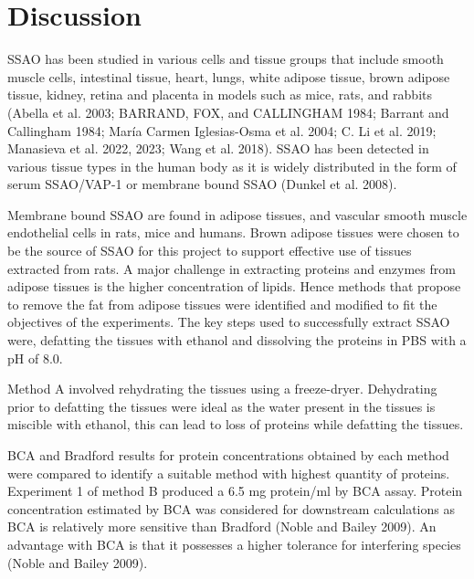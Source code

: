 \documentclass[
  letterpaper,
  DIV=11,
  numbers=noendperiod]{scrreprt}
\begin{document}

\chapter{Discussion}\label{discussion}

SSAO has been studied in various cells and tissue groups that include
smooth muscle cells, intestinal tissue, heart, lungs, white adipose
tissue, brown adipose tissue, kidney, retina and placenta in models such
as mice, rats, and rabbits (Abella et al. 2003; BARRAND, FOX, and
CALLINGHAM 1984; Barrant and Callingham 1984; María Carmen Iglesias-Osma
et al. 2004; C. Li et al. 2019; Manasieva et al. 2022, 2023; Wang et al.
2018). SSAO has been detected in various tissue types in the human body
as it is widely distributed in the form of serum SSAO/VAP-1 or membrane
bound SSAO (Dunkel et al. 2008).

Membrane bound SSAO are found in adipose tissues, and vascular smooth
muscle endothelial cells in rats, mice and humans. Brown adipose tissues
were chosen to be the source of SSAO for this project to support
effective use of tissues extracted from rats. A major challenge in
extracting proteins and enzymes from adipose tissues is the higher
concentration of lipids. Hence methods that propose to remove the fat
from adipose tissues were identified and modified to fit the objectives
of the experiments. The key steps used to successfully extract SSAO
were, defatting the tissues with ethanol and dissolving the proteins in
PBS with a pH of 8.0.

Method A involved rehydrating the tissues using a freeze-dryer.
Dehydrating prior to defatting the tissues were ideal as the water
present in the tissues is miscible with ethanol, this can lead to loss
of proteins while defatting the tissues.

BCA and Bradford results for protein concentrations obtained by each
method were compared to identify a suitable method with highest quantity
of proteins. Experiment 1 of method B produced a 6.5 mg protein/ml by
BCA assay. Protein concentration estimated by BCA was considered for
downstream calculations as BCA is relatively more sensitive than
Bradford (Noble and Bailey 2009). An advantage with BCA is that it
possesses a higher tolerance for interfering species (Noble and Bailey
2009).
\end{document}
